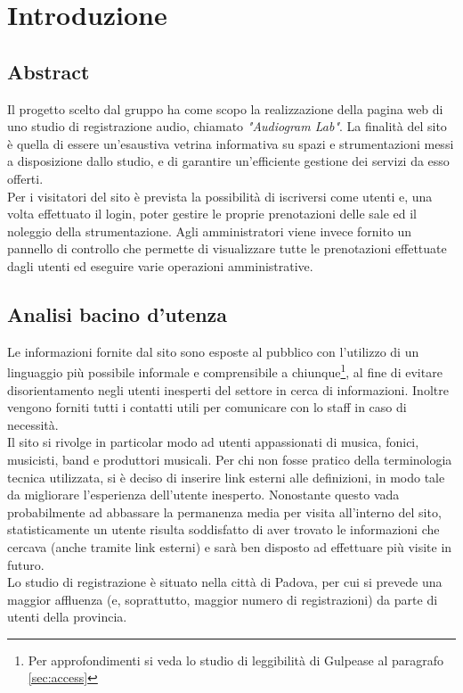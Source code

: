 \section{Introduzione}

\vspace{8px}

\subsection{Abstract}
Il progetto scelto dal gruppo ha come scopo la realizzazione della pagina web di uno studio di registrazione audio, chiamato \emph{"Audiogram Lab"}. La finalità del sito è quella di essere un'esaustiva vetrina informativa su spazi e strumentazioni messi a disposizione dallo studio, e di garantire un'efficiente gestione dei servizi da esso offerti.\\
Per i visitatori del sito è prevista la possibilità di iscriversi come utenti e, una volta effettuato il login, poter gestire le proprie prenotazioni delle sale ed il noleggio della strumentazione. Agli amministratori viene invece fornito un pannello di controllo che permette di visualizzare tutte le prenotazioni effettuate dagli utenti ed eseguire varie operazioni amministrative.

\vspace{8px}

\subsection{Analisi bacino d'utenza}
Le informazioni fornite dal sito sono esposte al pubblico con l'utilizzo di un linguaggio più possibile informale e comprensibile a chiunque\footnote{Per approfondimenti si veda lo studio di leggibilità di Gulpease al paragrafo \ref{sec:access} }, al fine di evitare disorientamento negli utenti inesperti del settore in cerca di informazioni. Inoltre vengono forniti tutti i contatti utili per comunicare con lo staff in caso di necessità.\\
Il sito si rivolge in particolar modo ad utenti appassionati di musica, fonici, musicisti, band e produttori musicali. Per chi non fosse pratico della terminologia tecnica utilizzata, si è deciso di inserire link esterni alle definizioni, in modo tale da migliorare l'esperienza dell'utente inesperto. Nonostante questo vada probabilmente ad abbassare la permanenza media per visita all'interno del sito, statisticamente un utente risulta soddisfatto di aver trovato le informazioni che cercava (anche tramite link esterni) e sarà ben disposto ad effettuare più visite in futuro. \\
Lo studio di registrazione è situato nella città di Padova, per cui si prevede una maggior affluenza (e, soprattutto, maggior numero di registrazioni) da parte di utenti della provincia.
